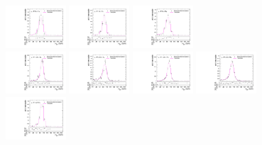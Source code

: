 \begin{figure}[htpb]
  \includegraphics[width=0.2\textwidth]{fig/2Dfit/templateVsReco_VBFWprToWZ2000_r0_MJ_mu_LP_bb_LDy.pdf}
  \includegraphics[width=0.2\textwidth]{fig/2Dfit/templateVsReco_VBFWprToWZ2000_r0_MJ_mu_HP_bb_HDy.pdf}
  \includegraphics[width=0.2\textwidth]{fig/2Dfit/templateVsReco_VBFWprToWZ2000_r0_MJ_mu_LP_bb_HDy.pdf}\\
  \includegraphics[width=0.2\textwidth]{fig/2Dfit/templateVsReco_VBFWprToWZ2000_r0_MJ_mu_HP_nobb_LDy.pdf}
  \includegraphics[width=0.2\textwidth]{fig/2Dfit/templateVsReco_VBFWprToWZ2000_r0_MJ_mu_LP_nobb_LDy.pdf}
  \includegraphics[width=0.2\textwidth]{fig/2Dfit/templateVsReco_VBFWprToWZ2000_r0_MJ_mu_HP_nobb_HDy.pdf}
  \includegraphics[width=0.2\textwidth]{fig/2Dfit/templateVsReco_VBFWprToWZ2000_r0_MJ_mu_LP_nobb_HDy.pdf}\\
  \includegraphics[width=0.2\textwidth]{fig/2Dfit/templateVsReco_VBFWprToWZ2000_r0_MJ_mu_HP_vbf_LDy.pdf}

\end{figure}
